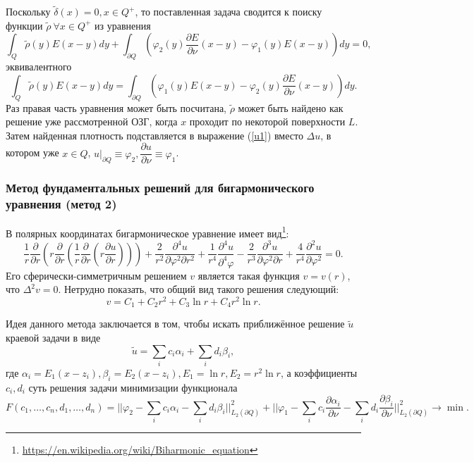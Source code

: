 \documentclass[a4paper]{article}
\newcommand{\der}[2]{\dfrac{\partial #1}{\partial #2}}
\begin{document}
Поскольку $\tilde{\delta}(x)=0, x \in Q^+$, то поставленная задача сводится к поиску функции $\tilde{\rho}\ \forall x \in Q^+$ из уравнения
\begin{equation}
    \int_Q \tilde{\rho}(y) E(x-y) dy + \int_{\partial Q} \left(\varphi_2(y)\der{E}{\nu}(x-y)-\varphi_1(y) E(x-y) \right) dy=0,
\end{equation} 
эквивалентного 
\begin{equation}
    \int_Q \tilde{\rho}(y) E(x-y) dy = \int_{\partial Q} \left(\varphi_1(y) E(x-y) -\varphi_2(y)\der{E}{\nu}(x-y)\right) dy.
    \label{bgogz}
\end{equation} 
Раз правая часть уравнения может быть посчитана, $\tilde{\rho}$ может быть найдено как решение уже рассмотренной ОЗГ, когда $x$ проходит по некоторой поверхности $L$.
Затем найденная плотность подставляется в выражение (\ref{u1}) вместо $\Delta u$, в котором уже $x \in Q$, $u|_{\partial Q} \equiv \varphi_2, \der{u}{\nu} \equiv \varphi_1$.

\subsubsection{Метод фундаментальных решений для бигармонического уравнения (метод 2)}

В полярных координатах бигармоническое уравнение имеет вид\footnote{\url{https://en.wikipedia.org/wiki/Biharmonic_equation}}:
\begin{equation}
  \dfrac{1}{r} \dfrac{\partial}{\partial r} \left(r \dfrac{\partial}{\partial r} \left( \dfrac{1}{r} \dfrac{\partial}{\partial r} \left(r \dfrac{\partial u}{\partial r}   \right)  \right)    \right) + \dfrac{2}{r^2} \dfrac{\partial^4 u}{\partial \varphi^2 \partial r^2} +\dfrac{1}{r^4} \dfrac{\partial^4 u}{\partial^4 \varphi} - \dfrac{2}{r^3} \dfrac{\partial^3 u}{\partial \varphi^2 \partial r} + \dfrac{4}{r^4} \dfrac{\partial^2 u}{\partial \varphi^2}=0.  
\end{equation}
Его сферически-симметричным решением $v$ является такая функция $v=v(r)$, что $\Delta^2 v=0$.
Нетрудно показать, что общий вид такого решения следующий:
\begin{equation*}
  v = C_1 + C_2 r^2 + C_3 \ln r + C_4 r^2 \ln r.
\end{equation*}

Идея данного метода заключается в том, чтобы искать приближённое решение $\tilde{u}$ краевой задачи в виде
\begin{equation*}
  \tilde{u} = \sum_i c_i \alpha_i + \sum_i d_i \beta_i,
\end{equation*}
где $\alpha_i=E_1(x-z_i), \beta_i = E_2(x-z_i), E_1=\ln r, E_2= r^2 \ln r$, а коэффициенты $c_i, d_i$ суть решения задачи минимизации функционала
\begin{equation*}
  F(c_1,\dots,c_n,d_1,\dots,d_n)= \biggl|\biggl|\varphi_2 -\sum_i c_i \alpha_i-\sum_i d_i \beta_i   \biggl|\biggl|_{L_2(\partial Q)}^2+\biggl|\biggl|\varphi_1 -\sum_i c_i \dfrac{\partial \alpha_i}{\partial \nu} -\sum_i d_i \dfrac{\partial \beta_i }{\partial \nu}   \biggl|\biggl|_{L_2(\partial Q)}^2 \rightarrow \min .
\end{equation*}
\end{document}
